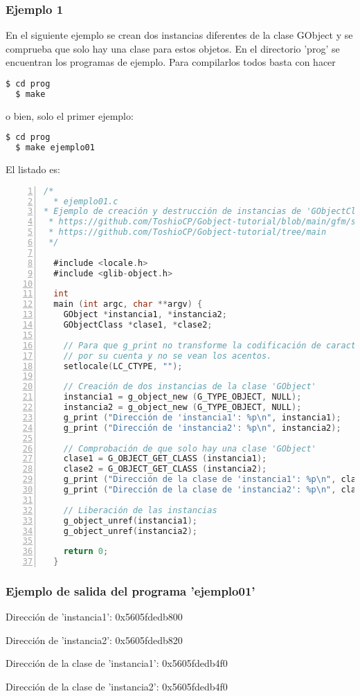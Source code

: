 \subsubsection{Ejemplo 1}
En el siguiente ejemplo se crean dos instancias diferentes de la clase \textsf{GObject} y se comprueba que
solo hay una clase para estos objetos. En el directorio 'prog' se encuentran los programas de ejemplo.
Para compilarlos todos basta con hacer
\begin{lstlisting}[language=bash]
  $ cd prog
  $ make
\end{lstlisting}
o bien, solo el primer ejemplo:
\begin{lstlisting}[language=bash]
  $ cd prog
  $ make ejemplo01
\end{lstlisting}

El listado es:
\begin{lstlisting}[language=C, numbers=left]
/*
  * ejemplo01.c
* Ejemplo de creación y destrucción de instancias de 'GObjectClass'.
 * https://github.com/ToshioCP/Gobject-tutorial/blob/main/gfm/sec2.md
 * https://github.com/ToshioCP/Gobject-tutorial/tree/main
 */

  #include <locale.h>
  #include <glib-object.h>

  int
  main (int argc, char **argv) {
    GObject *instancia1, *instancia2;
    GObjectClass *clase1, *clase2;

    // Para que g_print no transforme la codificación de caracteres
    // por su cuenta y no se vean los acentos.
    setlocale(LC_CTYPE, "");

    // Creación de dos instancias de la clase 'GObject'
    instancia1 = g_object_new (G_TYPE_OBJECT, NULL);
    instancia2 = g_object_new (G_TYPE_OBJECT, NULL);
    g_print ("Dirección de 'instancia1': %p\n", instancia1);
    g_print ("Dirección de 'instancia2': %p\n", instancia2);

    // Comprobación de que solo hay una clase 'GObject'
    clase1 = G_OBJECT_GET_CLASS (instancia1);
    clase2 = G_OBJECT_GET_CLASS (instancia2);
    g_print ("Dirección de la clase de 'instancia1': %p\n", clase1);
    g_print ("Dirección de la clase de 'instancia2': %p\n", clase2);

    // Liberación de las instancias
    g_object_unref(instancia1);
    g_object_unref(instancia2);

    return 0;
  }
\end{lstlisting}

\subsubsection{Ejemplo de salida del programa 'ejemplo01'}
\textsf{Dirección de 'instancia1': 0x5605fdedb800}\par
\textsf{Dirección de 'instancia2': 0x5605fdedb820}\par
\textsf{Dirección de la clase de 'instancia1':  0x5605fdedb4f0}\par
\textsf{Dirección de la clase de 'instancia2':  0x5605fdedb4f0}\par


